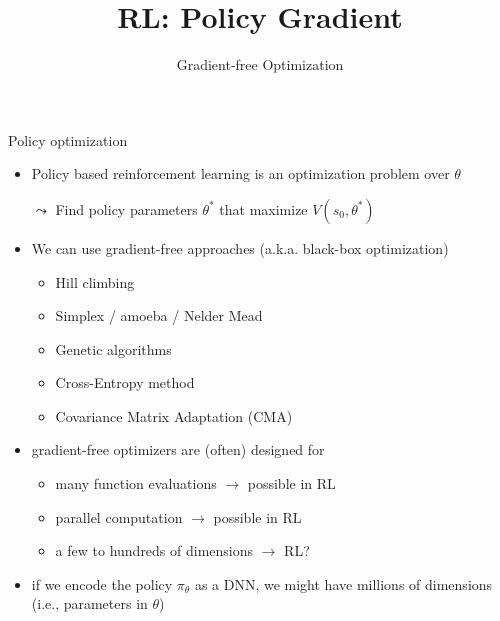 


\title[Reinforcement Learning: Big Picture]{RL: Policy Gradient}
\subtitle{Gradient-free Optimization}




	
	\maketitle

\begin{frame}[c]{Policy optimization}

\begin{itemize}
	\item Policy based reinforcement learning is an \alert{optimization} problem over $\theta$
	\item[$\leadsto$] Find policy parameters $\theta^*$ that maximize $V(s_0, \theta^*)$
	\item We can use gradient-free approaches (a.k.a. black-box optimization)
	\begin{itemize}
		\item Hill climbing
		\item Simplex / amoeba / Nelder Mead
		\item Genetic algorithms
		\item Cross-Entropy method
		\item Covariance Matrix Adaptation (CMA)
	\end{itemize}
	\pause
	\smallskip
	\item gradient-free optimizers are (often) designed for
	\begin{itemize}
		\item many function evaluations $\to$ possible in RL
		\item parallel computation $\to$ possible in RL
		\item a few to hundreds of dimensions $\to$ RL?
	\end{itemize}
	\pause
	\item if we encode the policy $\pi_\theta$ as a DNN, we might have \alert{millions} of dimensions (i.e., parameters in $\theta$)

\end{itemize}

\end{frame}
